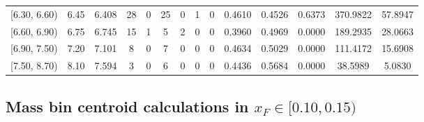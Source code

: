\begin{table}[htbp]
{\begin{tabular}{cc|c|cccccc|ccc|cc}
        {[6.30, 6.60)} & 6.45 & 6.408 & 28 & 0 & 25 & 0 & 1 & 0 & 0.4610 & 0.4526 & 0.6373 & 370.9822 & 57.8947 \\
        {[6.60, 6.90)} & 6.75 & 6.745 & 15 & 1 & 5 & 2 & 0 & 0 & 0.3960 & 0.4969 & 0.0000 & 189.2935 & 28.0663 \\
        {[6.90, 7.50)} & 7.20 & 7.101 & 8 & 0 & 7 & 0 & 0 & 0 & 0.4634 & 0.5029 & 0.0000 & 111.4172 & 15.6908 \\
        {[7.50, 8.70)} & 8.10 & 7.594 & 3 & 0 & 6 & 0 & 0 & 0 & 0.4436 & 0.5684 & 0.0000 & 38.5989 & 5.0830 \\
        \hline\hline
    \end{tabular}
    }
\end{table}

\clearpage
\subsection{\texorpdfstring{Mass bin centroid calculations in $x_F \in [0.10, 0.15)$}{Mass bin centroid calculations in x\_F in [0.10, 0.15)]}}

